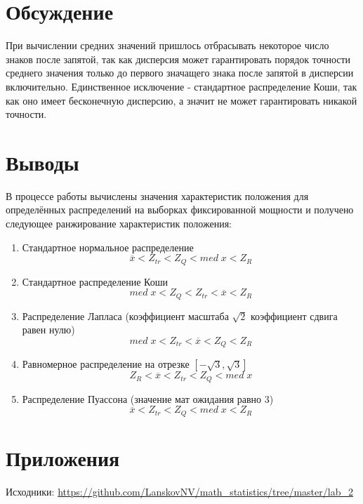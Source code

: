 \documentclass[12pt]{article}
\begin{document}
\section{Обсуждение}

\par При вычислении средних значений пришлось отбрасывать некоторое число знаков после запятой, так как дисперсия может гарантировать порядок точности среднего значения только до первого значащего знака после запятой в дисперсии включительно. Единственное исключение - стандартное распределение Коши, так как оно имеет бесконечную дисперсию, а значит не может гарантировать никакой точности.

\section{Выводы}

\par В процессе работы вычислены значения характеристик положения для определённых распределений на выборках фиксированной мощности и получено следующее ранжирование характеристик положения:

\begin{enumerate}
    \item Стандартное нормальное распределение $$\overline{x} < Z_{tr} < Z_Q < med\;x < Z_R$$
    
    \item Стандартное распределение Коши $$med\;x < Z_Q < Z_{tr} < \overline{x} < Z_R$$
    
    \item Распределение Лапласа (коэффициент масштаба $\sqrt{2}$ коэффициент сдвига равен нулю) $$med\;x < Z_{tr} < \overline{x} < Z_Q < Z_R$$
    
    \item Равномерное распределение на отрезке $\left[-\sqrt{3},\sqrt{3}\right]$ $$Z_R < \overline{x} < Z_{tr} < Z_Q < med\;x$$
    
    \item Распределение Пуассона (значение мат ожидания равно $3$) $$\overline{x} < Z_{tr} < Z_Q < med\;x < Z_R$$
    
\end{enumerate}

\section{Приложения}

Исходники: \url{https://github.com/LanskovNV/math_statistics/tree/master/lab_2}
\end{document}
